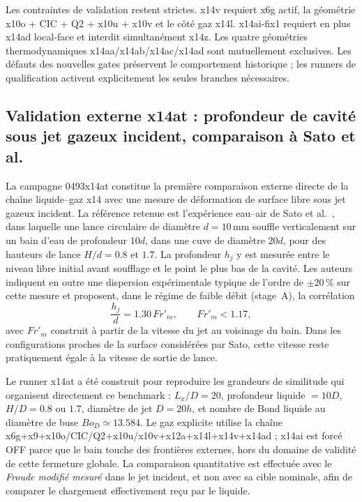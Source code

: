 \documentclass[11pt,a4paper]{article}
\begin{document}
Les contraintes de validation restent strictes. x14v requiert x6g actif, la géométrie x10o + CIC + Q2 + x10u + x10v et le côté gaz x14l. x14ai-fix1 requiert en plus x14ad local-face et interdit simultanément x14z. Les quatre géométries thermodynamiques x14aa/x14ab/x14ac/x14ad sont mutuellement exclusives. Les défauts des nouvelles gates préservent le comportement historique ; les runners de qualification activent explicitement les seules branches nécessaires.


\subsection{Validation externe x14at : profondeur de cavité sous jet gazeux incident, comparaison à Sato et al.}
\label{sec:x14at-sato}

La campagne 0493x14at constitue la première comparaison externe directe de la chaîne liquide--gaz x14 avec une mesure de déformation de surface libre sous jet gazeux incident. La référence retenue est l'expérience eau--air de Sato et al.~\cite{Sato2020}, dans laquelle une lance circulaire de diamètre $d=10\,\mathrm{mm}$ souffle verticalement sur un bain d'eau de profondeur $10d$, dans une cuve de diamètre $20d$, pour des hauteurs de lance $H/d=0.8$ et $1.7$. La profondeur $h_j$ y est mesurée entre le niveau libre initial avant soufflage et le point le plus bas de la cavité. Les auteurs indiquent en outre une dispersion expérimentale typique de l'ordre de $\pm20\,\%$ sur cette mesure et proposent, dans le régime de faible débit (stage~A), la corrélation
\begin{equation}
  \frac{h_j}{d}=1.30\,Fr'_m,
  \qquad Fr'_m<1.17,
  \label{eq:x14at-sato-stageA}
\end{equation}
avec $Fr'_m$ construit à partir de la vitesse du jet au voisinage du bain. Dans les configurations proches de la surface considérées par Sato, cette vitesse reste pratiquement égale à la vitesse de sortie de lance.

Le runner x14at a été construit pour reproduire les grandeurs de similitude qui organisent directement ce benchmark : $L_x/D=20$, profondeur liquide $=10D$, $H/D=0.8$ ou $1.7$, diamètre de jet $D=20h$, et nombre de Bond liquide au diamètre de buse $Bo_D\simeq13.584$. Le gaz explicite utilise la chaîne x6g+x9+x10o/CIC/Q2+x10u/x10v+x12a+x14l+x14v+x14ad ; x14ai est forcé OFF parce que le bain touche des frontières externes, hors du domaine de validité de cette fermeture globale. La comparaison quantitative est effectuée avec le \emph{Froude modifié mesuré} dans le jet incident, et non avec sa cible nominale, afin de comparer le chargement effectivement reçu par le liquide.
\end{document}
